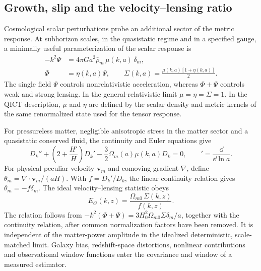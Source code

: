 \subsection{Growth, slip and the velocity--lensing ratio}
\label{sec:metric-scalar-joint}
Cosmological scalar perturbations probe an additional sector of the metric response. At subhorizon scales, in the quasistatic regime and in a specified gauge, a minimally useful parameterization of the scalar response is
\begin{align}
-k^2\Psi&=4\pi G a^2\bar\rho_m\,\mu(k,a)\,\delta_m,\\
\Phi&=\eta(k,a)\Psi,\qquad
\Sigma(k,a)=\frac{\mu(k,a)[1+\eta(k,a)]}{2}.
\end{align}
The single field $\Psi$ controls nonrelativistic acceleration, whereas $\Phi+\Psi$ controls weak and strong lensing. In the general-relativistic limit $\mu=\eta=\Sigma=1$. In the QICT description, $\mu$ and $\eta$ are defined by the scalar density and metric kernels of the same renormalized state used for the tensor response.

For pressureless matter, negligible anisotropic stress in the matter sector and a quasistatic conserved fluid, the continuity and Euler equations give
\begin{equation}
D_k''+\left(2+\frac{H'}{H}\right)D_k'-\frac32\Omega_m(a)\mu(k,a)D_k=0,
\qquad {}'=\frac{\dd}{\dd\ln a}.
\label{eq:joint-growth}
\end{equation}
For physical peculiar velocity $\mathbf v_m$ and comoving gradient $\nabla$, define $\theta_m=\nabla\cdot\mathbf v_m/(aH)$. With $f=D_k'/D_k$, the linear continuity relation gives $\theta_m=-f\delta_m$. The ideal velocity--lensing statistic obeys \cite{Zhang07}
\begin{equation}
\boxed{E_G(k,z)=\frac{\Omega_{m0}\,\Sigma(k,z)}{f(k,z)}.}\label{eq:eg-null}
\end{equation}
The relation follows from $-k^2(\Phi+\Psi)=3H_0^2\Omega_{m0}\Sigma\delta_m/a$, together with the continuity relation, after common normalization factors have been removed. It is independent of the matter-power amplitude in the idealized deterministic, scale-matched limit. Galaxy bias, redshift-space distortions, nonlinear contributions and observational window functions enter the covariance and window of a measured estimator.

